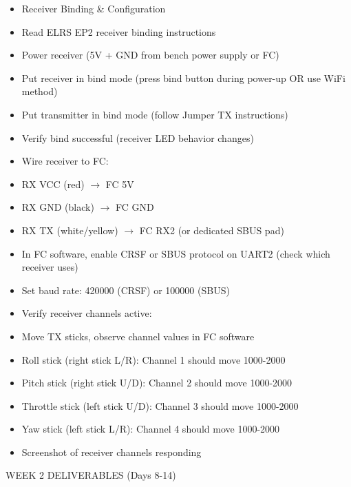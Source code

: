 \documentclass[11pt,letterpaper]{article}
\begin{document}
\begin{itemize}
  \item Receiver Binding \& Configuration
  \item Read ELRS EP2 receiver binding instructions
  \item Power receiver (5V + GND from bench power supply or FC)
  \item Put receiver in bind mode (press bind button during power-up OR use WiFi method)
  \item Put transmitter in bind mode (follow Jumper TX instructions)
  \item Verify bind successful (receiver LED behavior changes)
  \item Wire receiver to FC:
  \item RX VCC (red) $\rightarrow$ FC 5V
  \item RX GND (black) $\rightarrow$ FC GND
  \item RX TX (white/yellow) $\rightarrow$ FC RX2 (or dedicated SBUS pad)
  \item In FC software, enable CRSF or SBUS protocol on UART2 (check which receiver uses)
  \item Set baud rate: 420000 (CRSF) or 100000 (SBUS)
  \item Verify receiver channels active:
  \item Move TX sticks, observe channel values in FC software
  \item Roll stick (right stick L/R): Channel 1 should move 1000-2000
  \item Pitch stick (right stick U/D): Channel 2 should move 1000-2000
  \item Throttle stick (left stick U/D): Channel 3 should move 1000-2000
  \item Yaw stick (left stick L/R): Channel 4 should move 1000-2000
  \item Screenshot of receiver channels responding
\end{itemize}

WEEK 2 DELIVERABLES (Days 8-14)\par
\end{document}
